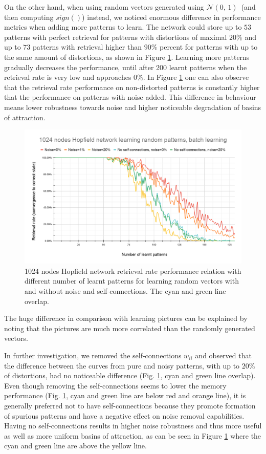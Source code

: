 \documentclass[a4paper]{article}
\begin{document}
On the other hand, when using random vectors generated using $\mathcal{N}(0,\,1)\,$ (and then computing $sign()$) instead, we noticed enormous difference in performance metrics when adding more patterns to learn. The network could store up to $53$ patterns with perfect retrieval for patterns with distortions of maximal $20\%$ and up to $73$ patterns with retrieval higher than $90\%$ percent for patterns with up to the same amount of distortions, as shown in Figure \ref{fig:random_capacity}. Learning more patterns gradually decreases the performance, until after 200 learnt patterns when the retrieval rate is very low and approaches $0\%$. In Figure \ref{fig:random_capacity} one can also observe that the retrieval rate performance on non-distorted patterns is constantly higher that the performance on patterns with noise added. This difference in behaviour means lower robustness towards noise and higher noticeable degradation of basins of attraction.

\begin{figure}[h]
    \centering
    \includegraphics[width=\linewidth]{img/6_random_capacity.png}
    \caption{1024 nodes Hopfield network retrieval rate performance relation with different number of learnt patterns for learning random vectors with and without noise and self-connections. The cyan and green line overlap.}
    \label{fig:random_capacity}
\end{figure}

The huge difference in comparison with learning pictures can be explained by noting that the pictures are much more correlated than the randomly generated vectors.

In further investigation, we removed the self-connections $w_{ii}$ and observed that the difference between the curves from pure and noisy patterns, with up to $20\%$ of distortions, had no noticeable difference (Fig. \ref{fig:random_capacity}, cyan and green line overlap). Even though removing the self-connections seems to lower the memory performance (Fig. \ref{fig:random_capacity}, cyan and green line are below red and orange line), it is generally preferred not to have self-connections because they promote formation of spurious patterns and have a negative effect on noise removal capabilities. Having no self-connections results in higher noise robustness and thus more useful as well as more uniform basins of attraction, as can be seen in Figure \ref{fig:random_capacity} where the cyan and green line are above the yellow line.   
\end{document}
